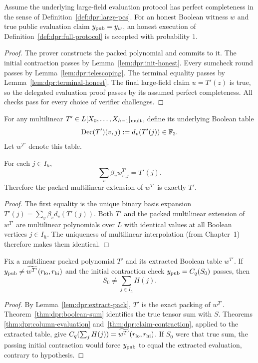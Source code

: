 \begin{theorem}\label{thm:dpr:complete}
Assume the underlying large-field
evaluation protocol has perfect
completeness in the sense of
Definition~\ref{def:dpr:large-pcs}.
For an honest Boolean witness $w$
and true public evaluation claim
$y_{\rm pub}=y_w$, an honest
execution of
Definition~\ref{def:dpr:full-protocol}
is accepted with probability $1$.
\end{theorem}
\begin{proof}
The prover constructs the packed
polynomial and commits to it.
The initial contraction passes by
Lemma~\ref{lem:dpr:init-honest}.
Every sumcheck round passes by
Lemma~\ref{lem:dpr:telescoping}.
The terminal equality passes by
Lemma~\ref{lem:dpr:terminal-honest}.
The final large-field claim
$u=T'(z)$ is true, so the
delegated evaluation proof passes
by its assumed perfect
completeness. All checks pass
for every choice of verifier
challenges.
\end{proof}

\begin{definition}\label{def:dpr:extract}
For any multilinear
$T'\in L[X_0,\ldots,X_{h-1}]_{\rm mult}$,
define its underlying Boolean table
\[
 \operatorname{Dec}(T')(v,j):=
 d_v(T'(j))\in\mathbb{F}_2.
\]
Let $w^{T'}$ denote this table.
\end{definition}

\begin{lemma}\label{lem:dpr:extract-pack}
For each $j\in I_h$,
\[
 \sum_v\beta_vw^{T'}_{v,j}=T'(j).
\]
Therefore the packed multilinear
extension of $w^{T'}$ is exactly
$T'$.
\end{lemma}
\begin{proof}
The first equality is the
unique binary basis expansion
$T'(j)=\sum_v\beta_vd_v(T'(j))$.
Both $T'$ and the packed multilinear
extension of $w^{T'}$ are
multilinear polynomials over $L$
with identical values at all
Boolean vertices $j\in I_h$.
The uniqueness of multilinear
interpolation (from Chapter~1)
therefore makes them identical.
\end{proof}

\begin{lemma}\label{lem:dpr:false-initial}
Fix a multilinear packed polynomial
$T'$ and its extracted Boolean
table $w^{T'}$.
If
$y_{\rm pub}\neq
\widetilde{w^{T'}}(r_{\rm lo},r_{\rm hi})$
and the initial contraction check
$y_{\rm pub}=C_q(S_0)$ passes,
then
\[
 S_0\neq\sum_{j\in I_h}H(j).
\]
\end{lemma}
\begin{proof}
By Lemma~\ref{lem:dpr:extract-pack},
$T'$ is the exact packing of
$w^{T'}$.
Theorem~\ref{thm:dpr:boolean-sum}
identifies the true tensor sum
with $S$. Theorems
\ref{thm:dpr:column-evaluation}
and~\ref{thm:dpr:claim-contraction},
applied to the extracted table,
give
$C_q(\sum_jH(j))
=\widetilde{w^{T'}}(r_{\rm lo},r_{\rm hi})$.
If $S_0$ were that true sum,
the passing initial contraction
would force $y_{\rm pub}$
to equal the extracted evaluation,
contrary to hypothesis.
\end{proof}

